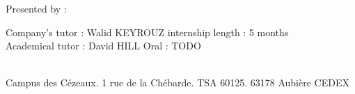 \begin{titlepage}
\begin{center}
    \vspace{1.5cm}
    \begin{large}
      Presented by : \textbf{\authorName}\\
    \end{large}
  \end{center}

  \vspace{4cm}
  Company's tutor : Walid KEYROUZ \hfill internship length : 5 months\\
  Academical tutor : David HILL \hfill Oral : TODO\\~\\

  \begin{center}
    \begin{small}
      Campus des Cézeaux. 1 rue de la Chébarde. TSA 60125. 63178 Aubière CEDEX\par
    \end{small}
  \end{center}
\end{titlepage}
